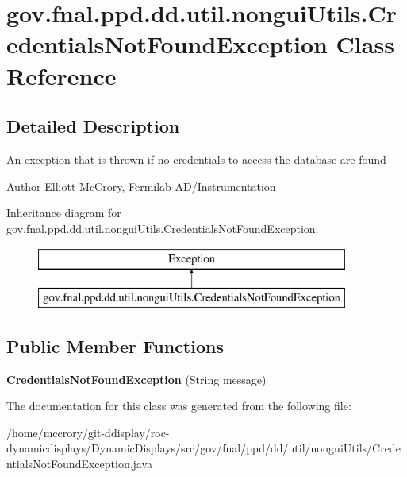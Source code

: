 \hypertarget{classgov_1_1fnal_1_1ppd_1_1dd_1_1util_1_1nonguiUtils_1_1CredentialsNotFoundException}{\section{gov.\-fnal.\-ppd.\-dd.\-util.\-nongui\-Utils.\-Credentials\-Not\-Found\-Exception Class Reference}
\label{classgov_1_1fnal_1_1ppd_1_1dd_1_1util_1_1nonguiUtils_1_1CredentialsNotFoundException}
}


\subsection{Detailed Description}
An exception that is thrown if no credentials to access the database are found

\begin{DoxyAuthor}{Author}
Elliott Mc\-Crory, Fermilab A\-D/\-Instrumentation 
\end{DoxyAuthor}
Inheritance diagram for gov.\-fnal.\-ppd.\-dd.\-util.\-nongui\-Utils.\-Credentials\-Not\-Found\-Exception\-:\begin{figure}[H]
\begin{center}
\leavevmode
\includegraphics[height=2.000000cm]{classgov_1_1fnal_1_1ppd_1_1dd_1_1util_1_1nonguiUtils_1_1CredentialsNotFoundException}
\end{center}
\end{figure}
\subsection*{Public Member Functions}
\begin{DoxyCompactItemize}
\item 
\hypertarget{classgov_1_1fnal_1_1ppd_1_1dd_1_1util_1_1nonguiUtils_1_1CredentialsNotFoundException_a4c697f734502ae8a92024f27512ad032}{{\bfseries Credentials\-Not\-Found\-Exception} (String message)}\label{classgov_1_1fnal_1_1ppd_1_1dd_1_1util_1_1nonguiUtils_1_1CredentialsNotFoundException_a4c697f734502ae8a92024f27512ad032}

\end{DoxyCompactItemize}


The documentation for this class was generated from the following file\-:\begin{DoxyCompactItemize}
\item 
/home/mccrory/git-\/ddisplay/roc-\/dynamicdisplays/\-Dynamic\-Displays/src/gov/fnal/ppd/dd/util/nongui\-Utils/Credentials\-Not\-Found\-Exception.\-java\end{DoxyCompactItemize}

